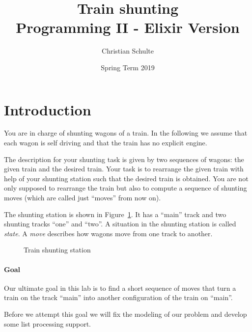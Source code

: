 \documentclass[a4paper,11pt]{article}
\begin{document}
\title{
    \textbf{Train shunting}\\
    \large{Programming II - Elixir Version}
}
\author{Christian Schulte}
\date{Spring Term 2019}
\maketitle


\thispagestyle{fancy}

\section{Introduction}

You are in charge of shunting wagons of a train.  In
the following we assume that each wagon is self driving and that the
train has no explicit engine.

The description for your shunting task is given by two sequences of
wagons: the given train and the desired train. Your task is to
rearrange the given train with help of your shunting station such that
the desired train is obtained. You are not only supposed to rearrange
the train but also to compute a sequence of shunting moves (which are
called just ``moves'' from now on).


The shunting station is shown in Figure~\ref{fig:station}. It has a
``main'' track and two shunting tracks ``one'' and ``two''.  A
situation in the shunting station is called \emph{state}. A
\emph{move} describes how wagons move from one track to another.

\begin{figure}[h]
\begin{center}
  \begin{tikzpicture}

  \end{tikzpicture}
\end{center}  
\caption{Train shunting station}
\label{fig:station}
\end{figure}

\paragraph{Goal}

Our ultimate goal in this lab is to find a short sequence
of moves that turn a train on the track ``main'' into another
configuration of the train on ``main''.

Before we attempt this goal we will fix the modeling of our
problem and develop some list processing support.
\end{document}
